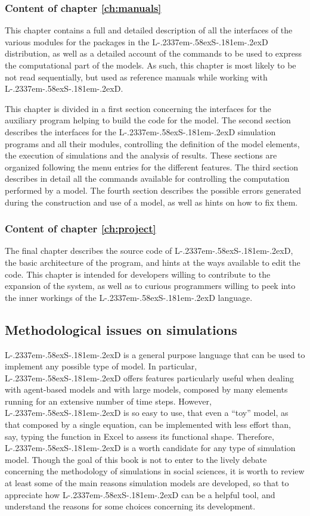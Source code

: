 \documentclass [11pt,a4paper] {book}
\def\LsD{{L\kern-.2337em\lower-.58ex\hbox{S}\kern-.181em\lower-.2ex\hbox{D}}\xspace}
\begin{document}
\subsubsection{Content of chapter \ref{ch:manuals}}

This chapter contains a full and detailed description of all the interfaces of the various modules for the packages in the \LsD distribution, as well as a detailed account of the commands to be used to express the computational part of the models. As such, this chapter is most likely to be not read sequentially, but used as reference manuals while working with \LsD.

This chapter is divided in a first section concerning the interfaces for the auxiliary program helping to build the code for the model. The second section describes the interfaces for the \LsD simulation programs and all their modules, controlling the definition of the model elements, the execution of simulations and the analysis of results. These sections are organized following the menu entries for the different features. The third section describes in detail all the commands available for controlling the computation performed by a model. The fourth section describes the possible errors generated during the construction and use of a model, as well as hints on how to fix them.

\subsubsection{Content of chapter \ref{ch:project}}

The final chapter describes the source code of \LsD, the basic architecture of the program, and hints at the ways available to edit the code. This chapter is intended for developers willing to contribute to the expansion of the system, as well as to curious programmers willing to peek into the inner workings of the \LsD language.



\subsection{Methodological issues on simulations}

\LsD is a general purpose language that can be used to implement any possible type of model. In particular, \LsD offers features particularly useful when dealing with agent-based models and with large models, composed by many elements running for an extensive number of time steps. However, \LsD is so easy to use, that even a ``toy'' model, as that composed by a single equation, can be implemented with less effort than, say, typing the function in Excel to assess its functional shape. Therefore, \LsD is a worth candidate for any type of simulation model. Though the goal of this book is not to enter to the lively debate concerning the methodology of simulations in social sciences, it is worth to review at least some of the main reasons simulation models are developed, so that to appreciate how \LsD can be a helpful tool, and understand the reasons for some choices concerning its development.
\end{document}
